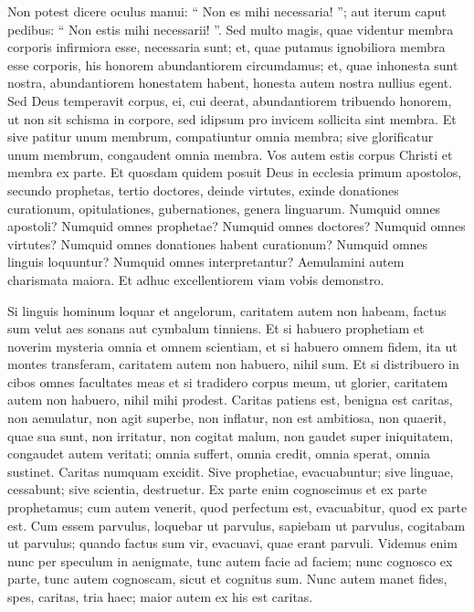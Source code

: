 \begin{biblechapter}
\begin{biblechapter}
\begin{biblechapter}
\begin{biblechapter}
\begin{biblechapter}
\begin{biblechapter}
\begin{biblechapter}
\begin{biblechapter}
\begin{biblechapter}
\begin{biblechapter}
\begin{biblechapter}
\begin{biblechapter}
\verse Non potest dicere oculus manui: “ Non es mihi necessaria! ”; aut iterum caput pedibus: “ Non estis mihi necessarii! ”. 
\verse Sed multo magis, quae videntur membra corporis infirmiora esse, necessaria sunt; 
 \verse et, quae putamus ignobiliora membra esse corporis, his honorem abundantiorem circumdamus; et, quae inhonesta sunt nostra, abundantiorem honestatem habent, 
 \verse honesta autem nostra nullius egent. Sed Deus temperavit corpus, ei, cui deerat, abundantiorem tribuendo honorem, 
\verse ut non sit schisma in corpore, sed idipsum pro invicem sollicita sint membra. 
\verse Et sive patitur unum membrum, compatiuntur omnia membra; sive glorificatur unum membrum, congaudent omnia membra. 
\verse Vos autem estis corpus Christi et membra ex parte.
 \verse Et quosdam quidem posuit Deus in ecclesia primum apostolos, secundo prophetas, tertio doctores, deinde virtutes, exinde donationes curationum, opitulationes, gubernationes, genera linguarum. 
\verse Numquid omnes apostoli? Numquid omnes prophetae? Numquid omnes doctores? Numquid omnes virtutes? 
\verse Numquid omnes donationes habent curationum? Numquid omnes linguis loquuntur? Numquid omnes interpretantur? 
\verse Aemulamini autem charismata maiora. Et adhuc excellentiorem viam vobis demonstro.
 
\begin{biblechapter}
\verse Si linguis hominum loquar et angelorum, caritatem autem non habeam, factus sum velut aes sonans aut cymbalum tinniens.
 \verse Et si habuero prophetiam et noverim mysteria omnia et omnem scientiam, et si habuero omnem fidem, ita ut montes transferam, caritatem autem non habuero, nihil sum.
 \verse Et si distribuero in cibos omnes facultates meas et si tradidero corpus meum, ut glorier, caritatem autem non habuero, nihil mihi prodest.
 \verse Caritas patiens est, benigna est caritas, non aemulatur, non agit superbe, non inflatur, 
\verse non est ambitiosa, non quaerit, quae sua sunt, non irritatur, non cogitat malum, 
\verse non gaudet super iniquitatem, congaudet autem veritati; 
 \verse omnia suffert, omnia credit, omnia sperat, omnia sustinet.
 \verse Caritas numquam excidit. Sive prophetiae, evacuabuntur; sive linguae, cessabunt; sive scientia, destruetur. 
\verse Ex parte enim cognoscimus et ex parte prophetamus; 
\verse cum autem venerit, quod perfectum est, evacuabitur, quod ex parte est. 
\verse Cum essem parvulus, loquebar ut parvulus, sapiebam ut parvulus, cogitabam ut parvulus; quando factus sum vir, evacuavi, quae erant parvuli. 
\verse Videmus enim nunc per speculum in aenigmate, tunc autem facie ad faciem; nunc cognosco ex parte, tunc autem cognoscam, sicut et cognitus sum.
 \verse Nunc autem manet fides, spes, caritas, tria haec; maior autem ex his est caritas.
 

\end{biblechapter}
\end{biblechapter}
\end{biblechapter}
\end{biblechapter}
\end{biblechapter}
\end{biblechapter}
\end{biblechapter}
\end{biblechapter}
\end{biblechapter}
\end{biblechapter}
\end{biblechapter}
\end{biblechapter}
\end{biblechapter}

